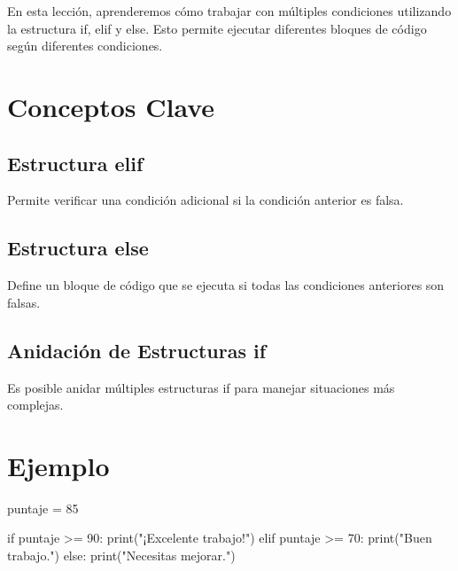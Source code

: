 \documentclass[
  a4paper,
  DIV=11,
  numbers=noendperiod,
  onepage,
  openany]{scrreprt}
\newenvironment{Shaded}{\begin{snugshade}}{\end{snugshade}}
\newcommand{\BuiltInTok}[1]{\textcolor[rgb]{0.00,0.23,0.31}{#1}}
\newcommand{\ControlFlowTok}[1]{\textcolor[rgb]{0.00,0.23,0.31}{#1}}
\newcommand{\DecValTok}[1]{\textcolor[rgb]{0.68,0.00,0.00}{#1}}
\newcommand{\NormalTok}[1]{\textcolor[rgb]{0.00,0.23,0.31}{#1}}
\newcommand{\OperatorTok}[1]{\textcolor[rgb]{0.37,0.37,0.37}{#1}}
\newcommand{\StringTok}[1]{\textcolor[rgb]{0.13,0.47,0.30}{#1}}
\begin{document}
En esta lección, aprenderemos cómo trabajar con múltiples condiciones
utilizando la estructura if, elif y else. Esto permite ejecutar
diferentes bloques de código según diferentes condiciones.

\section{Conceptos Clave}\label{conceptos-clave-13}

\subsection{Estructura elif}\label{estructura-elif}

Permite verificar una condición adicional si la condición anterior es
falsa.

\subsection{Estructura else}\label{estructura-else}

Define un bloque de código que se ejecuta si todas las condiciones
anteriores son falsas.

\subsection{Anidación de Estructuras
if}\label{anidaciuxf3n-de-estructuras-if}

Es posible anidar múltiples estructuras if para manejar situaciones más
complejas.

\section{Ejemplo}\label{ejemplo-8}

\begin{Shaded}
\begin{Highlighting}[]
\NormalTok{puntaje }\OperatorTok{=} \DecValTok{85}

\ControlFlowTok{if}\NormalTok{ puntaje }\OperatorTok{\textgreater{}=} \DecValTok{90}\NormalTok{:}
    \BuiltInTok{print}\NormalTok{(}\StringTok{"¡Excelente trabajo!"}\NormalTok{)}
\ControlFlowTok{elif}\NormalTok{ puntaje }\OperatorTok{\textgreater{}=} \DecValTok{70}\NormalTok{:}
    \BuiltInTok{print}\NormalTok{(}\StringTok{"Buen trabajo."}\NormalTok{)}
\ControlFlowTok{else}\NormalTok{:}
    \BuiltInTok{print}\NormalTok{(}\StringTok{"Necesitas mejorar."}\NormalTok{)}
\end{Highlighting}
\end{Shaded}
\end{document}
